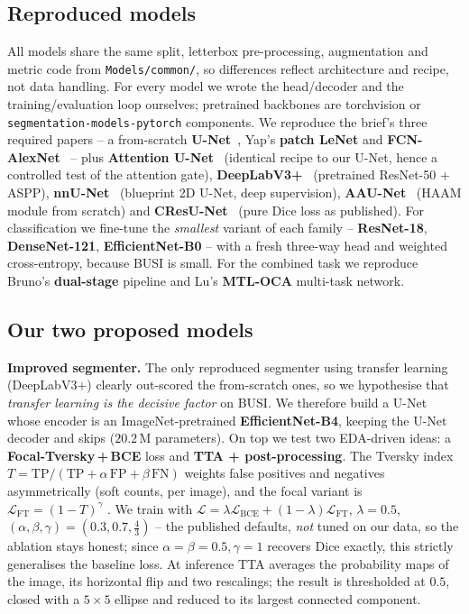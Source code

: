 \documentclass[10pt,twocolumn]{article}
\begin{document}
\subsection{Reproduced models}
All models share the same split, letterbox pre-processing, augmentation and metric
code from \texttt{Models/common/}, so differences reflect architecture and recipe,
not data handling. For every model we wrote the head/decoder and the
training/evaluation loop ourselves; pretrained backbones are torchvision or
\texttt{segmentation-models-pytorch} components. We reproduce the brief's three
required papers -- a from-scratch \textbf{U-Net}~\cite{ronneberger2015unet}, Yap's
\textbf{patch LeNet} and \textbf{FCN-AlexNet}~\cite{yap2018cnn} -- plus
\textbf{Attention U-Net}~\cite{oktay2018attentionunet} (identical recipe to our
U-Net, hence a controlled test of the attention gate),
\textbf{DeepLabV3+}~\cite{chen2018deeplabv3plus} (pretrained ResNet-50 + ASPP),
\textbf{nnU-Net}~\cite{isensee2021nnunet} (blueprint 2D U-Net, deep supervision),
\textbf{AAU-Net}~\cite{chen2023aaunet} (HAAM module from scratch) and
\textbf{CResU-Net}~\cite{derakhshandeh2024cresunet} (pure Dice loss as published).
For classification we fine-tune the \emph{smallest} variant of each family --
\textbf{ResNet-18}, \textbf{DenseNet-121}, \textbf{EfficientNet-B0} -- with a fresh
three-way head and weighted cross-entropy, because BUSI is small. For the combined
task we reproduce Bruno's \textbf{dual-stage} pipeline and Lu's \textbf{MTL-OCA}
multi-task network.

\subsection{Our two proposed models}
\label{sec:proposed}
\textbf{Improved segmenter.} The only reproduced segmenter using transfer learning
(DeepLabV3+) clearly out-scored the from-scratch ones, so we hypothesise that
\emph{transfer learning is the decisive factor} on BUSI. We therefore build a
U-Net whose encoder is an ImageNet-pretrained \textbf{EfficientNet-B4}, keeping the
U-Net decoder and skips ($20.2$\,M parameters). On top we test two EDA-driven
ideas: a \textbf{Focal-Tversky\,+\,BCE} loss and \textbf{TTA + post-processing}.
The Tversky index $T=\mathrm{TP}/(\mathrm{TP}+\alpha\,\mathrm{FP}+\beta\,\mathrm{FN})$
weights false positives and negatives asymmetrically (soft counts, per image), and
the focal variant is $\mathcal{L}_{\mathrm{FT}}=(1-T)^{\gamma}$
\cite{abraham2019focaltversky}. We train with
$\mathcal{L}=\lambda\mathcal{L}_{\mathrm{BCE}}+(1-\lambda)\mathcal{L}_{\mathrm{FT}}$,
$\lambda=0.5$, $(\alpha,\beta,\gamma)=(0.3,0.7,\tfrac43)$ -- the published
defaults, \emph{not} tuned on our data, so the ablation stays honest; since
$\alpha{=}\beta{=}0.5,\gamma{=}1$ recovers Dice exactly, this strictly generalises
the baseline loss. At inference TTA averages the probability maps of the image,
its horizontal flip and two rescalings; the result is thresholded at $0.5$, closed
with a $5\times5$ ellipse and reduced to its largest connected component.
\end{document}

